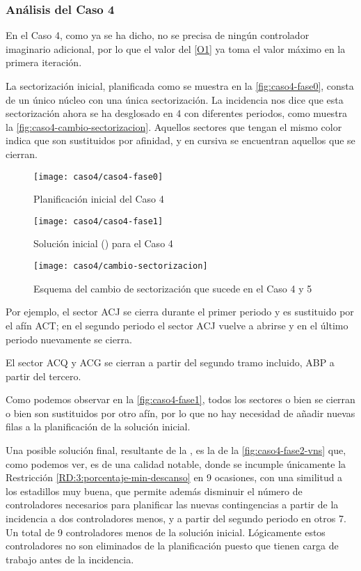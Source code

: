 \subsubsection{Análisis del Caso 4}

En el Caso 4, como ya se ha dicho, no se precisa de ningún controlador imaginario adicional, por lo que el valor del \ref{O1} ya toma el valor máximo en la primera iteración.

La sectorización inicial, planificada como se muestra en la \autoref{fig:caso4-fase0}, consta de un único núcleo con una única sectorización. La incidencia nos dice que esta sectorización ahora se ha desglosado en 4 con diferentes periodos, como muestra la \autoref{fig:caso4-cambio-sectorizacion}. Aquellos sectores que tengan el mismo color indica que son sustituidos por afinidad, y en cursiva se encuentran aquellos que se cierran.

\begin{figure}[!]
	\centering
	\texttt{[image: caso4/caso4-fase0]}
	\caption{Planificación inicial del Caso 4}
	\label{fig:caso4-fase0}
\end{figure}

\begin{figure}[!]
	\centering
	\texttt{[image: caso4/caso4-fase1]}
	\caption{Solución inicial (\faseuno{}) para el Caso 4}
	\label{fig:caso4-fase1}
\end{figure}

\begin{figure}[!]
	\centering
	\texttt{[image: caso4/cambio-sectorizacion]}
	\caption{Esquema del cambio de sectorización que sucede en el Caso 4 y 5}
	\label{fig:caso4-cambio-sectorizacion}
\end{figure}

Por ejemplo, el sector ACJ se cierra durante el primer periodo y es sustituido por el afín ACT; en el segundo periodo el sector ACJ vuelve a abrirse y en el último periodo nuevamente se cierra. 

El sector ACQ y ACG se cierran a partir del segundo tramo incluido, ABP a partir del tercero.

Como podemos observar en la \autoref{fig:caso4-fase1}, todos los sectores o bien se cierran o bien son sustituidos por otro afín, por lo que no hay necesidad de añadir nuevas filas a la planificación de la solución inicial.

Una posible solución final, resultante de la \fasedos{}, es la de la \autoref{fig:caso4-fase2-vns} que, como podemos ver, es de una calidad notable, donde se incumple únicamente la Restricción \ref{RD:3:porcentaje-min-descanso} en 9 ocasiones, con una similitud a los estadillos muy buena, que permite además disminuir el número de controladores necesarios para planificar las nuevas contingencias a partir de la incidencia a dos controladores menos, y a partir del segundo periodo en otros 7. Un total de 9 controladores menos de la solución inicial. Lógicamente estos controladores no son eliminados de la planificación puesto que tienen carga de trabajo antes de la incidencia.

